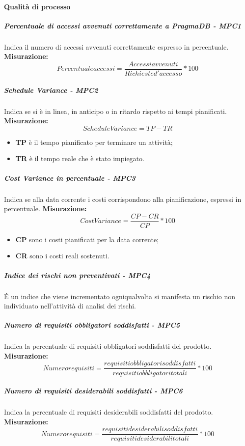 \paragraph{Qualità di processo}
\subparagraph{Percentuale di accessi avvenuti correttamente a PragmaDB - MPC1}
Indica il numero  di accessi avvenuti correttamente espresso in percentuale.\\
\textbf{Misurazione:}\begin{equation}
Percentuale accessi = \frac{Accessi avvenuti}{Richieste d'accesso} * 100
\end{equation}
\subparagraph{Schedule Variance - MPC2}
Indica se si è in linea, in anticipo o in ritardo rispetto ai tempi pianificati.\\
\textbf{Misurazione:}\begin{equation}
Schedule Variance = TP - TR 
\end{equation}
\begin{itemize}
	\item \textbf{TP} è il tempo pianificato per terminare un attività;
	\item \textbf{TR} è il tempo reale che è stato impiegato.
\end{itemize}		
\subparagraph{Cost Variance in percentuale - MPC3}
Indica se alla data corrente i costi corrispondono alla pianificazione, espressi in percentuale.
\textbf{Misurazione:}\begin{equation}
Cost Variance = \frac{CP - CR}{CP} * 100 
\end{equation}
\begin{itemize}
	\item \textbf{CP} sono i costi pianificati per la data corrente;
	\item \textbf{CR} sono i costi reali sostenuti.
\end{itemize}
\subparagraph{Indice dei rischi non preventivati - MPC4}
É un indice che viene incrementato ogniqualvolta si manifesta un rischio non individuato nell'attività di analisi dei rischi.
\subparagraph{Numero di requisiti obbligatori soddisfatti - MPC5}
Indica la percentuale di requisiti obbligatori soddisfatti del prodotto.
\textbf{Misurazione:}\begin{equation}
Numero requisiti = \frac{requisiti obbligatori soddisfatti}{requisiti obbligatori totali} * 100
\end{equation}
\subparagraph{Numero di requisiti desiderabili soddisfatti - MPC6}
Indica la percentuale di requisiti desiderabili soddisfatti del prodotto.
\textbf{Misurazione:}\begin{equation}
Numero requisiti = \frac{requisiti desiderabili soddisfatti}{requisiti desiderabili totali} * 100
\end{equation}

